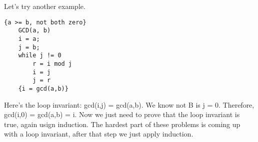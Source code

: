 \documentclass[nobib]{tufte-handout}
\begin{document}
Let's try another example. 
\begin{lstlisting}[caption=Loop invariant]
    {a >= b, not both zero}
    GCD(a, b)
    i = a;
    j = b;
    while j != 0
        r = i mod j 
        i = j 
        j = r 
    {i = gcd(a,b)}
\end{lstlisting}
Here's the loop invariant: gcd(i,j) = gcd(a,b). We know not B 
is j = 0. Therefore, gcd(i,0) = gcd(a,b) = i. Now we just need 
to prove that the loop invariant is true, again usign induction. 
The hardest part of these problems is coming up with a loop invariant, 
after that step we just apply induction. 
\end{document}
